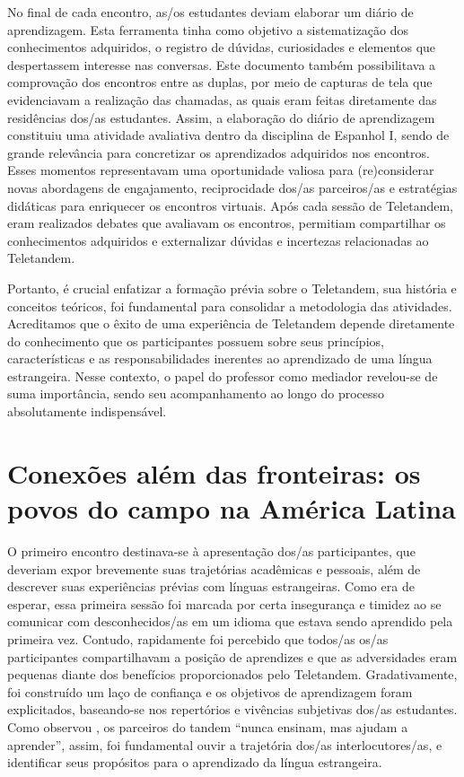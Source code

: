 \documentclass[portuguese]{textolivre}
\begin{document}
No final de cada encontro, as/os estudantes deviam elaborar um diário de aprendizagem. Esta ferramenta tinha como objetivo a sistematização dos conhecimentos adquiridos, o registro de dúvidas, curiosidades e elementos que despertassem interesse nas conversas. Este documento também possibilitava a comprovação dos encontros entre as duplas, por meio de capturas de tela que evidenciavam a realização das chamadas, as quais eram feitas diretamente das residências dos/as estudantes. Assim, a elaboração do diário de aprendizagem constituiu uma atividade avaliativa dentro da disciplina de Espanhol I, sendo de grande relevância para concretizar os aprendizados adquiridos nos encontros. Esses momentos representavam uma oportunidade valiosa para (re)considerar novas abordagens de engajamento, reciprocidade dos/as parceiros/as e estratégias didáticas para enriquecer os encontros virtuais. Após cada sessão de Teletandem, eram realizados debates que avaliavam os encontros, permitiam compartilhar os conhecimentos adquiridos e externalizar dúvidas e incertezas relacionadas ao Teletandem.

Portanto, é crucial enfatizar a formação prévia sobre o Teletandem, sua história e conceitos teóricos, foi fundamental para consolidar a metodologia das atividades. Acreditamos que o êxito de uma experiência de Teletandem depende diretamente do conhecimento que os participantes possuem sobre seus princípios, características e as responsabilidades inerentes ao aprendizado de uma língua estrangeira. Nesse contexto, o papel do professor como mediador revelou-se de suma importância, sendo seu acompanhamento ao longo do processo absolutamente indispensável.


\section{Conexões além das fronteiras: os povos do campo na América Latina}

O primeiro encontro destinava-se à apresentação dos/as participantes, que deveriam expor brevemente suas trajetórias acadêmicas e pessoais, além de descrever suas experiências prévias com línguas estrangeiras. Como era de esperar, essa primeira sessão foi marcada por certa insegurança e timidez ao se comunicar com desconhecidos/as em um idioma que estava sendo aprendido pela primeira vez. Contudo, rapidamente foi percebido que todos/as os/as participantes compartilhavam a posição de aprendizes e que as adversidades eram pequenas diante dos benefícios proporcionados pelo Teletandem. Gradativamente, foi construído um laço de confiança e os objetivos de aprendizagem foram explicitados, baseando-se nos repertórios e vivências subjetivas dos/as estudantes. Como observou \textcite[p.21]{brammerts2002aprender}, os parceiros do tandem “nunca ensinam, mas ajudam a aprender”, assim, foi fundamental ouvir a trajetória dos/as interlocutores/as, e identificar seus propósitos para o aprendizado da língua estrangeira. 
\end{document}
